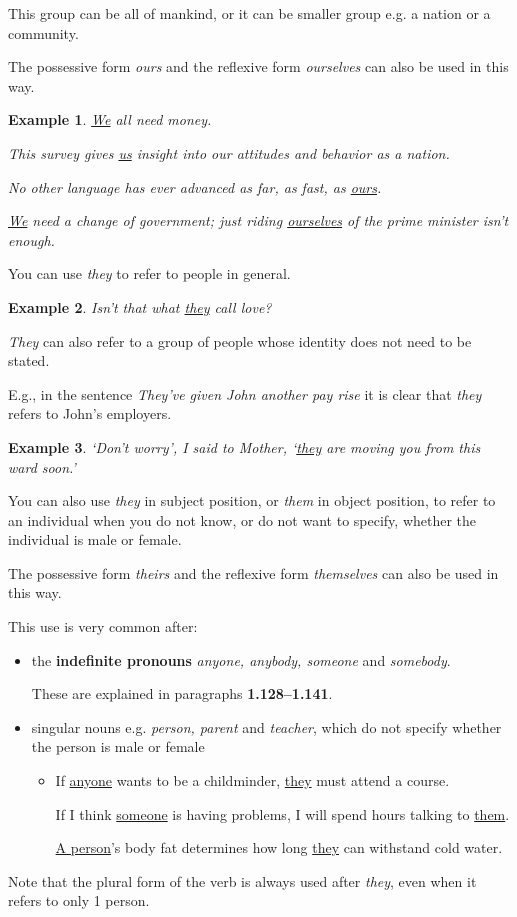 \documentclass[oneside]{book}
\numberwithin{equation}{section}
\newtheorem{example}{Example}[section]
\begin{document}
This group can be all of mankind, or it can be smaller group e.g. a nation or a community.

The possessive form \textit{ours} and the reflexive form \textit{ourselves} can also be used in this way.
\begin{example}
    \underline{We} all need money.
    
    This survey gives \underline{us} insight into our attitudes and behavior as a nation.
    
    No other language has ever advanced as far, as fast, as \underline{ours}.
    
    \underline{We} need a change of government; just riding \underline{ourselves} of the prime minister isn't enough.
\end{example}
%
\noindent{} You can use \textit{they} to refer to people in general.
\begin{example}
    Isn't that what \underline{they} call love?
\end{example}
\textit{They} can also refer to a group of people whose identity does not need to be stated.

E.g., in the sentence \textit{They've given John another pay rise} it is clear that \textit{they} refers to John's employers.
\begin{example}
    `Don't worry', I said to Mother, `\underline{they} are moving you from this ward soon.'
\end{example}
You can also use \textit{they} in subject position, or \textit{them} in object position, to refer to an individual when you do not know, or do not want to specify, whether the individual is male or female.

The possessive form \textit{theirs} and the reflexive form \textit{themselves} can also be used in this way.

This use is very common after:
\begin{itemize}
    \item the \textbf{indefinite pronouns} \textit{anyone, anybody, someone} and \textit{somebody}.
    
    These are explained in paragraphs \textbf{1.128--1.141}.
    \item singular nouns e.g. \textit{person, parent} and \textit{teacher}, which do not specify whether the person is male or female
    \begin{itemize}
        \item If \underline{anyone} wants to be a childminder, \underline{they} must attend a course.
        
        If I think \underline{someone} is having problems, I will spend hours talking to \underline{them}.
        
        \underline{A person}'s body fat determines how long \underline{they} can withstand cold water.
    \end{itemize}
\end{itemize}
Note that the plural form of the verb is always used after \textit{they}, even when it refers to only 1 person.
\end{document}
